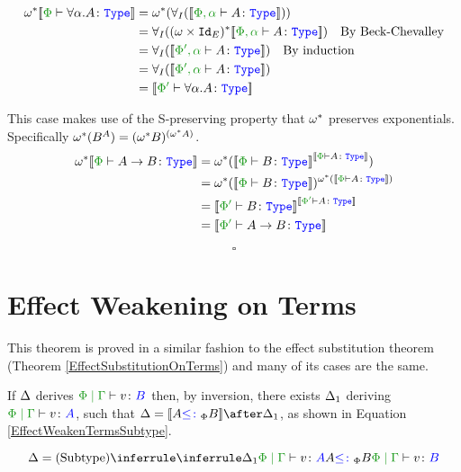     \begin{align*}
        \w\star\deno{\typerelation{\P}{\all{\a}A}{\type}} & = \w\star(\allI(\deno{\typerelation{\P,\a}{A}{\type}}))\\
        & = \allI((\w\times\Id{E})\star\deno{\typerelation{\P,\a}{A}{\type}})\qt{By Beck-Chevalley}\\
        & = \allI(\deno{\typerelation{\P',\a}{A}{\type}})\qt{By induction}\\
        & = \allI(\deno{\typerelation{\P',\a}{A}{\type}})\\
        & = \deno{\typerelation{\P'}{\all{\a}{A}}{\type}}\\
    \end{align*}

\case{\tfun}
This case makes use of the S-preserving property that $\omega^*$ preserves exponentials. Specifically $\omega^*(B^A) = (\omega^* B)^{(\omega^* A)}$.
\begin{align*}
    \w\star\deno{\typerelation{\P}{\ab}{\type}} &= \w\star(\deno{\typerelation{\P}{B}{\type}}^{\deno{\typerelation{\P}{A}{\type}}})\\
    &=\w\star(\deno{\typerelation{\P}{B}{\type}})^{\w\star(\deno{\typerelation{\P}{A}{\type}})}\\
    & = \deno{\typerelation{\P'}{B}{\type}}^{\deno{\typerelation{\P'}{A}{\type}}}\\
    & = \deno{\typerelation{\P'}{\ab}{\type}}\\
\end{align*}

$$\square$$

\section{Effect Weakening on Terms} \label{AppendixEffectWeakeningOnTerms}
This theorem is proved in a similar fashion to the effect substitution theorem (Theorem \ref{EffectSubstitutionOnTerms}) and many of its cases are the same.

\case{\vsubtype}
If $\Delta$ derives $\gpetyperelation{v}{B}$ then, by inversion, there exists $\Delta_1$ deriving $\gpetyperelation{v}{A}$, such that $ \D = \deno{A\subtypep B}\after \D_1$, as shown in Equation \ref{EffectWeakenTermsSubtype}.

\begin{equation}
    \label{EffectWeakenTermsSubtype}
    \D = \ntreeruleII{\vsubtype}{\treeruleI{\D_1}{\gpetyperelation{v}{A}}}{ A \subtypep B}{\gpetyperelation{v}{B}}
\end{equation}

